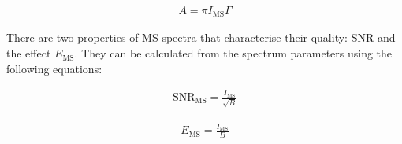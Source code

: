 \begin{equation}
\begin{aligned}
A = \pi I_{\textrm{MS}} \Gamma
\end{aligned}
\label{area}
\end{equation}

There are two properties of MS spectra that characterise their quality: SNR and the effect $E_{\textrm{MS}}$. They can be calculated from the spectrum parameters using the following equations:

\begin{equation}
\begin{aligned}
\textrm{SNR}_{\textrm{MS}} = \frac{I_{\textrm{MS}}}{\sqrt{B}}
\end{aligned}
\label{SNR}
\end{equation}

\begin{equation}
\begin{aligned}
E_{\textrm{MS}} = \frac{I_{\textrm{MS}}}{B}
\end{aligned}
\label{effect}
\end{equation}



